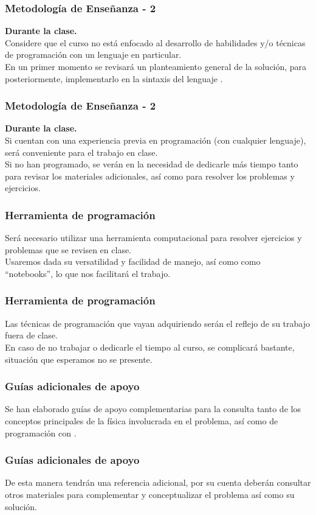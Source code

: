 \documentclass[12pt]{beamer}
\begin{document}
\begin{frame} 
\frametitle{Metodología de Enseñanza - 2}
\textbf{Durante la clase.}
\\
\medskip
Considere que el curso no está enfocado al desarrollo de habilidades y/o técnicas de programación con un lenguaje en particular. 
\\
\bigskip
\pause
En un primer momento se revisará un planteamiento general de la solución, para posteriormente, implementarlo en la sintaxis del lenguaje \textoazul{\python}.
\end{frame}
\begin{frame} 
\frametitle{Metodología de Enseñanza - 2}
\textbf{Durante la clase.}
\\
\vspace{0.5em}
Si cuentan con una experiencia previa en programación (con cualquier lenguaje), será conveniente para el trabajo en clase.
\\
\bigskip
\pause
Si no han programado, se verán en la necesidad de dedicarle más tiempo tanto para revisar los materiales adicionales, así como para resolver los problemas y ejercicios.
\end{frame}
\begin{frame}
\frametitle{Herramienta de programación}
Será necesario utilizar una herramienta computacional para resolver ejercicios y problemas que se revisen en clase.
\\
\bigskip
Usaremos \textoazul{\python} dada su versatilidad y facilidad de manejo, así como  como \enquote{notebooks}, lo que nos facilitará el trabajo.
\end{frame}
\begin{frame}
\frametitle{Herramienta de programación}
Las técnicas de programación que vayan adquiriendo serán el reflejo de su trabajo fuera de clase.
\\
\bigskip
\pause
En caso de no trabajar o dedicarle el tiempo al curso, se complicará bastante, situación que esperamos no se presente.
\end{frame}
\begin{frame}
\frametitle{Guías adicionales de apoyo}
Se han elaborado guías de apoyo complementarias para la consulta tanto de los conceptos principales de la física involucrada en el problema, así como de programación con \textoazul{\python}.
\end{frame}
\begin{frame}
\frametitle{Guías adicionales de apoyo}
De esta manera tendrán una referencia adicional, por su cuenta deberán consultar otros materiales para complementar y conceptualizar el problema así como su solución.
\end{frame}
\end{document}
